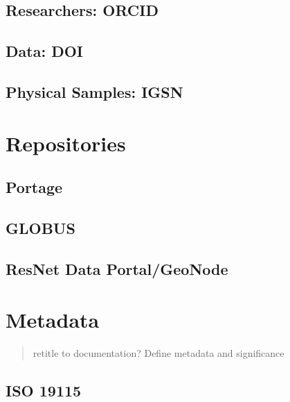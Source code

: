 \documentclass[
]{book}
\begin{document}
\hypertarget{researchers-orcid}{%
\subsection{Researchers: ORCID}\label{researchers-orcid}}

\hypertarget{data-doi}{%
\subsection{Data: DOI}\label{data-doi}}

\hypertarget{physical-samples-igsn}{%
\subsection{Physical Samples: IGSN}\label{physical-samples-igsn}}

\hypertarget{repositories}{%
\section{Repositories}\label{repositories}}

\hypertarget{portage}{%
\subsection{Portage}\label{portage}}

\hypertarget{globus}{%
\subsection{GLOBUS}\label{globus}}

\hypertarget{resnet-data-portalgeonode}{%
\subsection{ResNet Data Portal/GeoNode}\label{resnet-data-portalgeonode}}

\hypertarget{metadata}{%
\section{Metadata}\label{metadata}}

\begin{quote}
retitle to documentation?
Define metadata and significance
\end{quote}

\hypertarget{iso-19115}{%
\subsection{ISO 19115}\label{iso-19115}}
\end{document}
